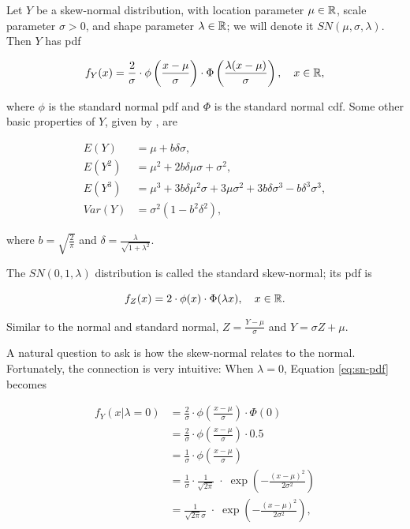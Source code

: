 \documentclass{article}
\begin{document}
Let $Y$ be a skew-normal distribution, with location parameter $\mu \in \mathbb{R}$,
scale parameter $\sigma > 0$, and shape parameter $\lambda \in \mathbb{R}$; we will
denote it $SN(\mu, \sigma, \lambda)$. Then $Y$ has pdf

\begin{equation} \label{eq:sn-pdf}
  f_Y(x) = \frac2\sigma \cdot \phi \left( \frac{x-\mu}{\sigma} \right) \cdot \Phi \left( \frac{\lambda(x-\mu)}{\sigma} \right), \quad x \in \mathbb{R},
\end{equation}

where $\phi$ is the standard normal pdf and $\Phi$ is the standard normal cdf.
Some other basic properties of $Y$, given by \citet{pewsey}, are

\begin{align}
  E(Y) &= \mu + b \delta \sigma, \nonumber \\
  E(Y^2) &= \mu^2 + 2b \delta \mu \sigma + \sigma^2, \label{eq:sn-basic-properties} \\
  E(Y^3) &= \mu^3 + 3 b \delta \mu^2 \sigma + 3 \mu \sigma^2 + 3 b \delta \sigma^3 - b \delta^3 \sigma^3, \nonumber \\
  Var(Y) &= \sigma^2 (1 - b^2 \delta^2), \nonumber
\end{align}

where $b = \sqrt{\frac{2}{\pi}}$ and $\delta = \frac{\lambda}{\sqrt{1 +
\lambda^2}}$.

The $SN(0,1,\lambda)$ distribution is called the standard skew-normal; its pdf
is

\begin{equation} \label{eq:standard-sn-pdf}
  f_Z(x) = 2 \cdot \phi(x) \cdot \Phi (\lambda x), \quad x \in \mathbb{R}.
\end{equation}

Similar to the normal and standard normal, $Z = \frac{Y - \mu}{\sigma}$ and $Y
= \sigma Z + \mu$.

A natural question to ask is how the skew-normal relates to the normal.
Fortunately, the connection is very intuitive: When $\lambda = 0$, Equation
\eqref{eq:sn-pdf} becomes

\begin{align*}
  f_Y(x|\lambda=0) &= \frac2\sigma \cdot \phi \left( \frac{x-\mu}{\sigma} \right) \cdot \Phi(0) \\
  &= \frac2\sigma \cdot \phi \left( \frac{x-\mu}{\sigma} \right) \cdot 0.5 \\
  &= \frac1\sigma \cdot \phi \left( \frac{x-\mu}{\sigma} \right) \\
  &= \frac1\sigma \cdot \frac{1}{\sqrt{2\pi}} \;\cdot\; \exp \left( -\frac{(x-\mu)^2}{2\sigma^2} \right) \\
  &= \frac{1}{\sqrt{2\pi}\sigma} \;\cdot\; \exp \left( -\frac{(x-\mu)^2}{2\sigma^2} \right),
\end{align*}
\end{document}
